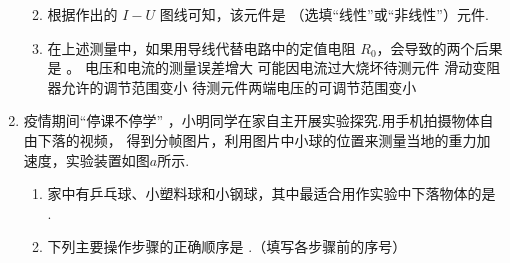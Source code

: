 \begin{enumerate}
\begin{enumerate}
\begin{figure}[h!]
\end{figure}

\item 
根据作出的 $ I-U $ 图线可知，该元件是 \underlinegap （选填“线性”或“非线性”）元件.
\item 
在上述测量中，如果用导线代替电路中的定值电阻 $ R_{0} $，会导致的两个后果是 \underlinegap 。
\fourchoices
{电压和电流的测量误差增大}
{可能因电流过大烧坏待测元件}
{滑动变阻器允许的调节范围变小}
{待测元件两端电压的可调节范围变小}


\end{enumerate}







\item
疫情期间“停课不停学”
，小明同学在家自主开展实验探究.用手机拍摄物体自由下落的视频，
得到分帧图片，利用图片中小球的位置来测量当地的重力加速度，实验装置如图$ a $所示.
\begin{figure}[h!]
\centering
\begin{subfigure}{0.35\linewidth}
\centering
 
\caption{}\label{}
\end{subfigure}
\begin{subfigure}{0.55\linewidth}
\centering
 
\caption{}\label{}
\end{subfigure}
\end{figure}
\begin{enumerate}
\item
家中有乒乓球、小塑料球和小钢球，其中最适合用作实验中下落物体的是 \underlinegap .
\item 
下列主要操作步骤的正确顺序是 \underlinegap .（填写各步骤前的序号）


\end{enumerate}
\end{enumerate}
